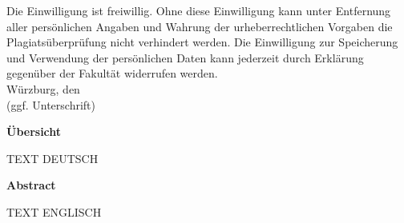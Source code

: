 \documentclass[bt]{dbvdoc}
\begin{document}
Die Einwilligung ist freiwillig. Ohne diese Einwilligung kann unter Entfernung aller persönlichen
Angaben und Wahrung der urheberrechtlichen Vorgaben die Plagiatsüberprüfung nicht verhindert
werden. Die Einwilligung zur Speicherung und Verwendung der persönlichen Daten kann jederzeit
durch Erklärung gegenüber der Fakultät widerrufen werden.\\[5mm]
Würzburg, den\\[20mm]
(ggf. Unterschrift)

\clearpage

\begin{center}
\bf Übersicht
\end{center}
TEXT DEUTSCH


\vfill
\begin{center}
\bf Abstract
\end{center}
TEXT ENGLISCH

\vfill
\cleardoublepage

\tableofcontents

\cleardoublepage {}


\cleardoublepage

\cleardoublepage

\cleardoublepage

\cleardoublepage

\cleardoublepage
\nocite{*}  %
% 
% 

\printbibliography
\cleardoublepage

\listoffigures\cleardoublepage

\listoftables\cleardoublepage
\end{document}
